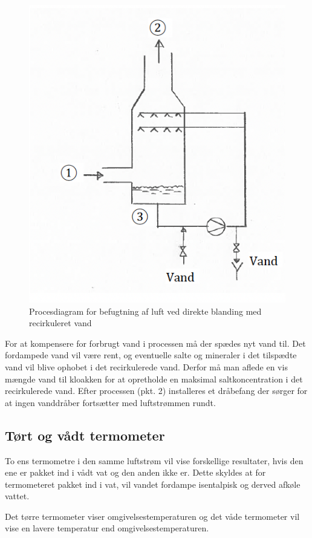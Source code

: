 \begin{figure} [ht]
  \centering
  \includegraphics[width=0.5\linewidth]{./figures/f12_3.png}
  \caption{Procesdiagram for befugtning af luft ved direkte blanding med recirkuleret vand}
  \label{fig:f12_3}
\end{figure}

For at kompensere for forbrugt vand i processen må der spædes nyt vand til. Det fordampede vand vil være rent, og eventuelle salte og mineraler i det tilspædte vand vil blive ophobet i det recirkulerede vand. Derfor må man aflede en vis mængde vand til kloakken for at opretholde en maksimal saltkoncentration i det recirkulerede vand. Efter processen (pkt. 2) installeres et dråbefang der sørger for at ingen vanddråber fortsætter med luftstrømmen rundt.

\subsection{Tørt og vådt termometer} \label{afs:term}
To ens termometre i den samme luftstrøm vil vise forskellige resultater, hvis den ene er pakket ind i vådt vat og den anden ikke er. Dette skyldes at for termometeret pakket ind i vat, vil vandet fordampe isentalpisk og derved afkøle vattet.

Det tørre termometer viser omgivelsestemperaturen og det våde termometer vil vise en lavere temperatur end omgivelsestemperaturen.
